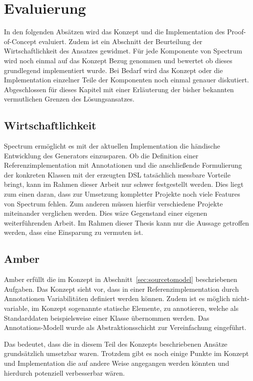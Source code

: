 \documentclass[12pt,oneside,a4paper,parskip]{scrbook}
\begin{document}
\chapter{Evaluierung}

In den folgenden Absätzen wird das Konzept und die Implementation des Proof-of-Concept evaluiert. Zudem ist ein Abschnitt der Beurteilung der Wirtschaftlichkeit des Ansatzes gewidmet. Für jede Komponente von Spectrum wird noch einmal auf das Konzept Bezug genommen und bewertet ob dieses grundlegend implementiert wurde. Bei Bedarf wird das Konzept oder die Implementation einzelner Teile der Komponenten noch einmal genauer diskutiert. Abgeschlossen für dieses Kapitel mit einer Erläuterung der bisher bekannten vermutlichen Grenzen des Lösungsansatzes.

\section{Wirtschaftlichkeit}

Spectrum ermöglicht es mit der aktuellen Implementation die händische Entwicklung des Generators einzusparen. Ob die Definition einer Referenzimplementation mit Annotationen und die anschließende Formulierung der konkreten Klassen mit der erzeugten DSL tatsächlich messbare Vorteile bringt, kann im Rahmen dieser Arbeit nur schwer festgestellt werden. Dies liegt zum einen daran, dass zur Umsetzung kompletter Projekte noch viele Features von Spectrum fehlen. Zum anderen müssen hierfür verschiedene Projekte miteinander verglichen werden. Dies wäre Gegenstand einer eigenen weiterführenden Arbeit. Im Rahmen dieser Thesis kann nur die Aussage getroffen werden, dass eine Einsparung zu vermuten ist.

\section{Amber}

Amber erfüllt die im Konzept in Abschnitt~\ref{sec:sourcetomodel} beschriebenen Aufgaben. Das Konzept sieht vor, dass in einer Referenzimplementation durch Annotationen Variabilitäten definiert werden können. Zudem ist es möglich nicht-variable, im Konzept sogenannte statische Elemente, zu annotieren, welche als Standarddaten beispielsweise einer Klasse übernommen werden. Das Annotations-Modell wurde als Abstraktionsschicht zur Vereinfachung eingeführt.

Das bedeutet, dass die in diesem Teil des Konzepts beschriebenen Ansätze grundsätzlich umsetzbar waren. Trotzdem gibt es noch einige Punkte im Konzept und Implementation die auf andere Weise angegangen werden könnten und hierdurch potenziell verbesserbar wären.
\end{document}
